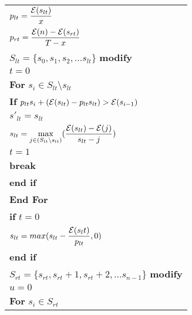 \begin{table}
\begin{minipage}[b]{8cm}
\begin{tabular}{p{7cm}}
\hspace{4mm}$p_{lt} = \dfrac{\mathcal{E}(s_{lt})}{x}$
\\
\hspace{4mm}$p_{rt} = \dfrac{\mathcal{E}(n)-\mathcal{E}(s_{rt})}{T-x}$
\\
\hspace{4mm}$S_{lt} = \{s_0,s_1,s_2,...s_{lt}\}$ \textbf{modify}
\\
\hspace{4mm}$t=0$
\\
\hspace{4mm}\textbf{For} $s_i \in S_{lt}\setminus s_{lt}$
\\
\hspace{7mm}\textbf{If} $p_{lt}s_i + (\mathcal{E}(s_{lt}) - p_{lt}s_{lt}) > \mathcal{E}(s_{i-1})$
\\
\hspace{10mm}$s'_{lt} = s_{lt}$
\\
\hspace{10mm}$s_{lt} = \displaystyle \max_{j\in(S_{lt}\setminus {s_{lt}})}(\dfrac{\mathcal{E}(s_{lt}) - \mathcal{E}(j)}{s_{lt}-j})$
\\
\hspace{10mm}$t=1$
\\
\hspace{10mm}\textbf{break}
\\
\hspace{7mm}\textbf{end if}
\\
\hspace{4mm}\textbf{End For}
\\
\hspace{4mm}\textbf{if} $t=0$
\\
\hspace{7mm}$s_{lt} = max(s_{lt} - \dfrac{\mathcal{E}(s_lt)}{p_{lt}} , 0)$
\\
\hspace{4mm}\textbf{end if}
\\
\hspace{4mm}$S_{rt} = \{s_{rt},s_{rt}+1,s_{rt}+2,...s_{n-1}\}$ \textbf{modify}
\\
\hspace{4mm}$u=0$
\\
\hspace{4mm}\textbf{For} $s_i \in S_{rt}$
\\

\end{tabular}
\end{minipage}
\end{table}
